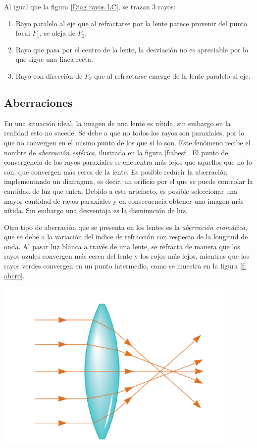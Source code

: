 \documentclass[a4paper,12pt]{article}
\newenvironment{Figure}
  {\par\medskip\noindent\minipage{\linewidth}}
  {\endminipage\par\medskip}
\begin{document}
\begin{multicols*}{2}
        Al igual que la figura \ref{Diag rayos LC}, se trazan 3 rayos:

        \begin{enumerate}
            \item Rayo paralelo al eje que al refractarse por la lente parece provenir del punto focal $F_{1}$, se aleja de $F_{2}$.
            \item Rayo que pasa por el centro de la lente, la desviación no es apreciable por lo que sigue una línea recta.
            \item Rayo con dirección de $F_{2}$ que al refractarse emerge de la lente paralelo al eje.
        \end{enumerate}

    \subsection*{Aberraciones}

        En una situación ideal, la imagen de una lente es nítida, sin embargo en la realidad esto no sucede. Se debe a que no todos los rayos son paraxiales, por lo que no convergen en el mismo punto de los que sí lo son. Este fenómeno recibe el nombre de \emph{aberración esférica}, ilustrada en la figura \ref{f:abesf}. El punto de convergencia de los rayos paraxiales se encuentra más lejos que aquellos que no lo son, que convergen más cerca de la lente. Es posible reducir la aberración implementando un diafragma, es decir, un orificio por el que se puede controlar la cantidad de luz que entra. Debido a este artefacto, es posible seleccionar una mayor cantidad de rayos paraxiales y en consecuencia obtener una imagen más nítida. Sin embargo una desventaja es la disminución de luz.

        Otro tipo de aberración que se presenta en los lentes es la \emph{aberración cromática}, que se debe a la variación del indice de refracción con respecto de la longitud de onda. Al pasar luz blanca a través de una lente, se refracta de manera que los rayos azules convergen más cerca del lente y los rojos más lejos, mientras que los rayos verdes convergen en un punto intermedio, como se muestra en la figura \ref{f: abcro}.

        \begin{Figure}
            \centering
            \includegraphics[width=0.7\linewidth]{AberracionEsferica.png}
            \label{f:abesf}
        \end{Figure}


\end{multicols*}
\end{document}
